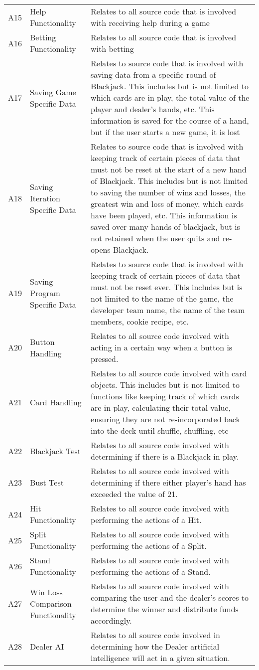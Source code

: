 \documentclass [landscape, 8pt] {article}
\begin{document}
\begin {table}
\begin {tabular}{p{4cm} p{4cm} p{15cm}}
			A15 & Help Functionality & Relates to all source code that is involved with receiving help during a game\\
			A16 & Betting Functionality & Relates to all source code that is involved with betting \\
			A17 & Saving Game Specific Data & Relates to source code that is involved with saving data from a specific round of Blackjack. This includes but is not limited to which cards are in play, the total value of the player and dealer's hands, etc. This information is saved for the course of a hand, but if the user starts a new game, it is lost \\
			A18 & Saving Iteration Specific Data & Relates to source code that is involved with keeping track of certain pieces of data that must not be reset at the start of a new hand of Blackjack. This includes but is not limited to saving the number of wins and losses, the greatest win and loss of money, which cards have been played, etc. This information is saved over many hands of blackjack, but is not retained when the user quits and re-opens Blackjack.\\
			A19 & Saving Program Specific Data & Relates to source code that is involved with keeping track of certain pieces of data that must not be reset ever. This includes but is not limited to the name of the game, the developer team name, the name of the team members, cookie recipe, etc. \\
			A20 & Button Handling & Relates to all source code involved with acting in a certain way when a button is pressed. \\
			A21 & Card Handling & Relates to all source code involved with card objects. This includes but is not limited to functions like keeping track of which cards are in play, calculating their total value, ensuring they are not re-incorporated back into the deck until shuffle, shuffling, etc\\
			A22 & Blackjack Test & Relates to all source code involved with determining if there is a Blackjack in play. \\
			A23 & Bust Test & Relates to all source code involved with determining if there either player's hand has exceeded the value of 21.\\
			A24 & Hit Functionality & Relates to all source code involved with performing the actions of a Hit.\\
			A25 & Split Functionality & Relates to all source code involved with performing the actions of a Split.\\
			A26 & Stand Functionality & Relates to all source code involved with performing the actions of a Stand.\\
			A27 & Win Loss Comparison Functionality & Relates to all source code involved with comparing the user and the dealer's scores to determine the winner and distribute funds accordingly.\\
			A28 & Dealer AI & Relates to all source code involved in determining how the Dealer artificial intelligence will act in a given situation. \\
	\end {tabular}
	\label {table: asp}
	\end {table}
\end{document}
